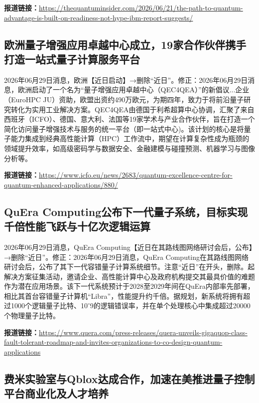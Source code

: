 \documentclass[12pt,a4paper]{ctexart}
\begin{document}
\noindent\textbf{报道链接：}\url{https://thequantuminsider.com/2026/06/21/the-path-to-quantum-advantage-is-built-on-readiness-not-hype-ibm-report-suggests/}

\subsection{ 欧洲量子增强应用卓越中心成立，19家合作伙伴携手打造一站式量子计算服务平台 }

2026年06月29日消息，欧洲【近日启动】→删除“近日”。修正：2026年06月29日消息，欧洲启动了一个名为“量子增强应用卓越中心（QEC4QEA）”的新倡议...企业（EuroHPC JU）资助，欧盟出资约490万欧元，为期四年，致力于将前沿量子研究转化为实用工业解决方案。QEC4QEA由德国于利希超算中心协调，汇聚了来自西班牙（ICFO）、德国、意大利、法国等19家学术与产业合作伙伴，旨在打造一个简化访问量子增强技术与服务的统一平台（即一站式中心)。该计划的核心是将量子能力集成到经典高性能计算（HPC）工作流中，期望在计算复杂性成为瓶颈的领域提升效率，如高级密码学与数据安全、金融建模与碰撞预测、机器学习与图像分析等。

\noindent\textbf{报道链接：}\url{https://www.icfo.eu/news/2683/quantum-excellence-centre-for-quantum-enhanced-applications/880/}

\subsection{ QuEra Computing公布下一代量子系统，目标实现千倍性能飞跃与十亿次逻辑运算 }

2026年06月29日消息，QuEra Computing【近日在其路线图网络研讨会后，公布】→删除“近日”。修正：2026年06月29日消息，QuEra Computing在其路线图网络研讨会后，公布了其下一代容错量子计算系统细节。注意“近日”在开头，删除。起解决方案征集活动，邀请企业、高性能计算中心及政府机构提交其最具价值的难题作为潜在应用场景。该下一代系统预计于2028至2029年间在QuEra内部率先部署，相比其首台容错量子计算机“Libra”，性能提升约千倍。据规划，新系统将拥有超过1000个逻辑量子比特、10⁻9的逻辑错误率，并在单个处理核心中集成超过20000个物理量子比特。

\noindent\textbf{报道链接：}\url{https://www.quera.com/press-releases/quera-unveils-gigaquop-class-fault-tolerant-roadmap-and-invites-organizations-to-co-design-quantum-applications}

\subsection{ 费米实验室与Qblox达成合作，加速在美推进量子控制平台商业化及人才培养 }
\end{document}
